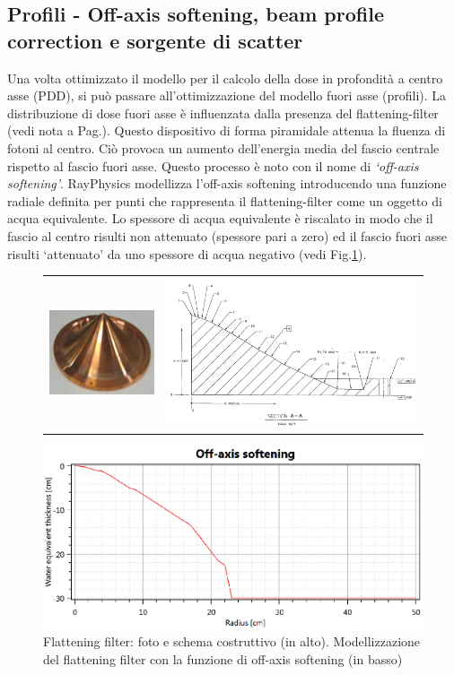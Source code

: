 \subsection{Profili - Off-axis softening, beam profile correction e sorgente di scatter}
Una volta ottimizzato il modello per il calcolo della dose in profondità a centro asse (PDD), si può passare all'ottimizzazione del modello fuori asse (profili). La distribuzione di dose fuori asse è influenzata dalla presenza del flattening-filter (vedi nota a Pag.\pageref{foot:flatt}). Questo dispositivo di forma piramidale attenua la fluenza di fotoni al centro. Ciò provoca un aumento dell'energia media del fascio centrale rispetto al fascio fuori asse. Questo processo è noto con il nome di \textit{`off-axis softening'}. RayPhysics modellizza l'off-axis softening introducendo una funzione radiale definita per punti che rappresenta il flattening-filter come un oggetto di acqua equivalente. Lo spessore di acqua equivalente è riscalato in modo che il fascio al centro risulti non attenuato (spessore pari a zero) ed il fascio fuori asse risulti `attenuato' da uno spessore di acqua negativo (vedi Fig.\ref{fig:Ray_flatt}).
\begin{figure}[!t]
\centering
\begin{tabular}{m{}m{}}
\vspace*{-0.5cm}\includegraphics[width=.3\textwidth]{./cap2/Ray_flatt1.png} &
\includegraphics[width=.6\textwidth]{./cap2/Ray_flatt2.png}
\end{tabular}
\includegraphics[width=.9\textwidth]{./cap2/Ray_flatt3.png}
\caption{Flattening filter: foto e schema costruttivo (in alto). Modellizzazione del flattening filter con la funzione di off-axis softening (in basso)}
\label{fig:Ray_flatt}
\end{figure}

